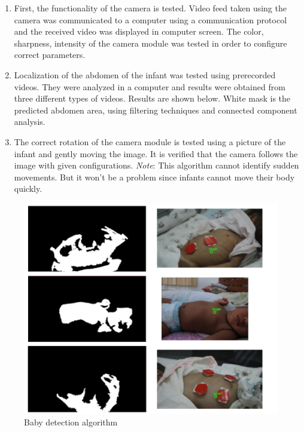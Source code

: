 \documentclass{report}
\begin{document}
\begin{enumerate}
    \item First, the functionality of the camera is tested. Video feed taken using the camera was communicated to a computer using a communication protocol and the received video was displayed in computer screen. The color, sharpness, intensity of the camera module was tested in order to configure correct parameters.
    \item Localization of the abdomen of the infant was tested using prerecorded videos. They were analyzed in a computer and results were obtained from three different types of videos. Results are shown below. White mask is the predicted abdomen area, using filtering techniques and connected component analysis.
    \item The correct rotation of the camera module is tested using a picture of the infant and gently moving the image. It is verified that the camera follows the image with given configurations.
    \emph{Note}: This algorithm cannot identify sudden movements. But it won't be a problem since infants cannot move their body quickly.
    
\end{enumerate}

\begin{figure}[H]
    \centering
    \includegraphics[scale=0.6]{b0.png}
    \caption{Baby detection algorithm}
    \label{fig:Baby detection algorithm}
\end{figure}


\clearpage
\end{document}
